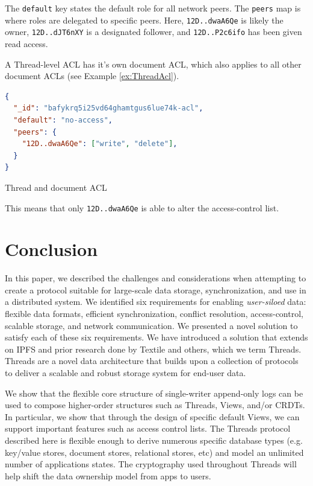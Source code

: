 \documentclass{textile}
\begin{document}
The \texttt{default} key states the default role for all network peers. The \texttt{peers} map is where roles are delegated to specific peers. Here, \texttt{12D..dwaA6Qe} is likely the owner, \texttt{12D..dJT6nXY} is a designated follower, and \texttt{12D..P2c6ifo} has been given read access.

 A Thread-level ACL has it's own document ACL, which also applies to all other document ACLs (see Example \ref{ex:ThreadAcl}).

\begin{example}
\begin{lstlisting}[language=json,firstnumber=1]
{
  "_id": "bafykrq5i25vd64ghamtgus6lue74k-acl",
  "default": "no-access",
  "peers": {
    "12D..dwaA6Qe": ["write", "delete"],
  }
}
\end{lstlisting}
\caption{Thread and document ACL}
\label{ex:ThreadAcl}
\end{example} 

This means that only \texttt{12D..dwaA6Qe} is able to alter the access-control list.

\section{Conclusion}

In this paper, we described the challenges and considerations when attempting to create a protocol suitable for large-scale data storage, synchronization, and use in a distributed system. We identified six requirements for enabling \emph{user-siloed} data: flexible data formats, efficient synchronization, conflict resolution, access-control, scalable storage, and network communication. We presented a novel solution to satisfy each of these six requirements. We have introduced a solution that extends on IPFS and prior research done by Textile and others, which we term Threads. Threads are a novel data architecture that builds upon a collection of protocols to deliver a scalable and robust storage system for end-user data. 

We show that the flexible core structure of single-writer append-only logs can be used to compose higher-order structures such as Threads, Views, and/or CRDTs. In particular, we show that through the design of specific default Views, we can support important features such as access control lists. The Threads protocol described here is flexible enough to derive numerous specific database types (e.g. key/value stores, document stores, relational stores, etc) and model an unlimited number of applications states. The cryptography used throughout Threads will help shift the data ownership model from apps to users. 
\end{document}
